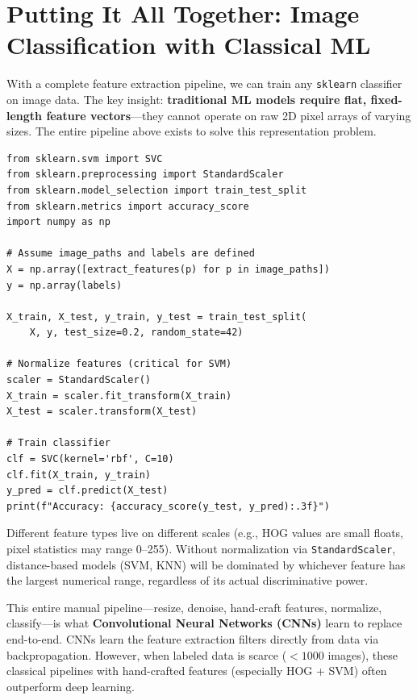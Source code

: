 \section*{Putting It All Together: Image Classification with Classical ML}

With a complete feature extraction pipeline, we can train any \texttt{sklearn} classifier on image data. The key insight: \textbf{traditional ML models require flat, fixed-length feature vectors}---they cannot operate on raw 2D pixel arrays of varying sizes. The entire pipeline above exists to solve this representation problem.

\begin{lstlisting}[style=pythonstyle]
from sklearn.svm import SVC
from sklearn.preprocessing import StandardScaler
from sklearn.model_selection import train_test_split
from sklearn.metrics import accuracy_score
import numpy as np

# Assume image_paths and labels are defined
X = np.array([extract_features(p) for p in image_paths])
y = np.array(labels)

X_train, X_test, y_train, y_test = train_test_split(
    X, y, test_size=0.2, random_state=42)

# Normalize features (critical for SVM)
scaler = StandardScaler()
X_train = scaler.fit_transform(X_train)
X_test = scaler.transform(X_test)

# Train classifier
clf = SVC(kernel='rbf', C=10)
clf.fit(X_train, y_train)
y_pred = clf.predict(X_test)
print(f"Accuracy: {accuracy_score(y_test, y_pred):.3f}")
\end{lstlisting}

\begin{remark}
Different feature types live on different scales (e.g., HOG values are small floats, pixel statistics may range 0--255). Without normalization via \texttt{StandardScaler}, distance-based models (SVM, KNN) will be dominated by whichever feature has the largest numerical range, regardless of its actual discriminative power.
\end{remark}

\begin{remark}
This entire manual pipeline---resize, denoise, hand-craft features, normalize, classify---is what \textbf{Convolutional Neural Networks (CNNs)} learn to replace end-to-end. CNNs learn the feature extraction filters directly from data via backpropagation. However, when labeled data is scarce ($< 1000$ images), these classical pipelines with hand-crafted features (especially HOG + SVM) often outperform deep learning.
\end{remark}
